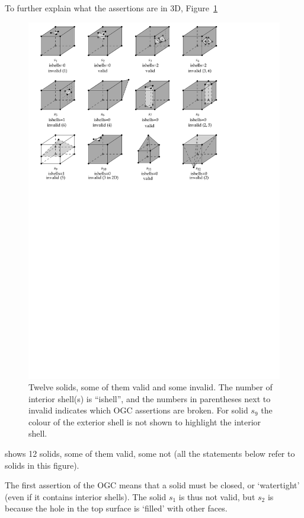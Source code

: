 To further explain what the assertions are in 3D, Figure~\ref{fig:validornot}
\begin{figure}
  \centering
  \includegraphics[width=\textwidth]{figs/validornot.pdf}
  \caption[Twelve solids, some of them valid and some invalid]{Twelve solids, some of them valid and some invalid. The number of interior shell(s) is ``ishell'', and the numbers in parentheses next to invalid indicates which OGC assertions are broken. For solid $s_9$ the colour of the exterior shell is not shown to highlight the interior shell.}%
\label{fig:validornot}
\end{figure}
shows 12 solids, some of them valid, some not (all the statements below refer to solids in this figure).

The first assertion of the OGC means that a solid must be closed, or `watertight' (even if it contains interior shells).
The solid $s_1$ is thus not valid, but $s_2$ is because the hole in the top surface is `filled' with other faces.

